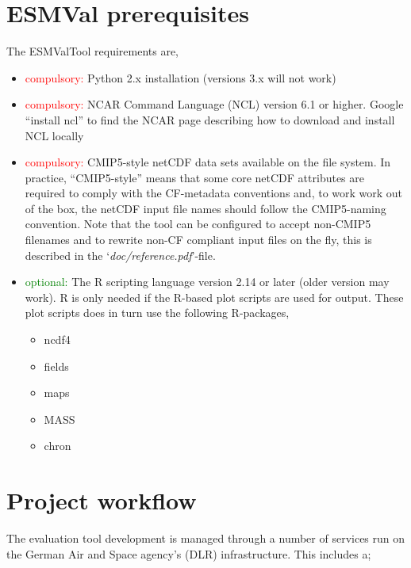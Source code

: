 \documentclass[12pt]{article}
\newcommand{\docref}[1]{`\emph{#1}'}
\begin{document}
\section{ESMVal prerequisites}\label{section:prerequisites}
The ESMValTool requirements are, 
\begin{itemize}
\item{\textcolor{red}{compulsory:}} Python 2.x installation (versions
3.x will not work)

\item{\textcolor{red}{compulsory:}} NCAR Command Language
(NCL)\cite{ncar-ncl-homepage} version 6.1 or higher. Google ``install
ncl'' to find the NCAR page describing how to download and install NCL
locally

\item{\textcolor{red}{compulsory:}} CMIP5-style\cite{pcmdi-cmip5}
netCDF data sets available on the file system. In practice,
``CMIP5-style'' means that some core netCDF attributes are required to
comply with the CF-metadata conventions\cite{pcmdi-cf-conventions}
and, to work work out of the box, the netCDF input file names should
follow the CMIP5-naming convention\cite{DRS-document:2010}. Note that
the tool can be configured to accept non-CMIP5 filenames and to
rewrite non-CF compliant input files on the fly, this is described in
the \docref{doc/reference.pdf}-file.

\item{\textcolor{green}{optional:}} The R scripting
language\cite{R-language-ref:2013} version 2.14 or later (older
version may work). R is only needed if the R-based plot scripts are
used for output. These plot scripts does in turn use the following
R-packages, 
\begin{itemize}
\item ncdf4
\item fields
\item maps
\item MASS
\item chron
\end{itemize}

\end{itemize}



% 
% 
\section{Project workflow}\label{section:project_workflow}
The evaluation tool development is managed through a number of
services run on the German Air and Space agency's (DLR)
infrastructure. This includes a;
\end{document}
